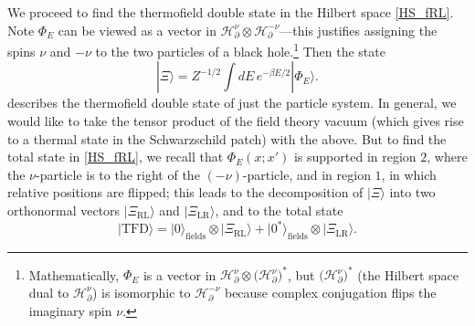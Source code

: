 \documentclass[12pt]{article}
\newcommand*{\ket}[1]{|{#1}\rangle}
\newcommand{\calH}{\mathcal{H}}
\newcommand{\la}{\text{L}}
\newcommand{\ra}{\text{R}}
\newcommand{\TFD}{\mathrm{TFD}}
\newcommand{\p}{\partial}
\begin{document}
We proceed to find the thermofield double state in the Hilbert space \eqref{HS_fRL}. Note $\Phi_E$ can be viewed as a vector in $\calH^{\nu}_{\p} \otimes \calH^{-\nu}_{\p}$---this justifies assigning the spins $\nu$ and $-\nu$ to the two particles of a black hole.\footnote{Mathematically, $\Phi_E$ is a vector in $\calH^{\nu}_{\p}\otimes\bigl(\calH^{\nu}_{\p}\bigr)^*$, but $\bigl(\calH^{\nu}_{\p}\bigr)^*$ (the Hilbert space dual to $\calH^{\nu}_{\p}$) is isomorphic to  $\calH^{-\nu}_{\p}$ because complex conjugation flips the imaginary spin $\nu$.} Then the state
\begin{equation}\label{Xi}
\ket{\Xi}=Z^{-1/2}\int dE \,e^{-\beta E/2} \ket{\Phi_E}.
\end{equation}
describes the thermofield double state of just the particle system. In general, we would like to take the tensor product of the field theory vacuum (which gives rise to a thermal state in the Schwarzschild patch) with the above. But to find the total state in \eqref{HS_fRL}, we recall that $\Phi_E(x;x')$ is supported in region $2$, where the $\nu$-particle is to the right of the $(-\nu)$-particle, and in region $1$, in which relative positions are flipped; this leads to the decomposition of $\ket{\Xi}$ into two orthonormal vectors $\ket{\Xi_{\ra\la}}$ and $\ket{\Xi_{\la\ra}}$, and to the total state 
\begin{equation}\label{TFD}
\ket{\TFD}=\ket{0}_{\text{fields}}\otimes\ket{\Xi_{\ra\la}}
+\ket{0^*}_{\text{fields}}\otimes\ket{\Xi_{\la\ra}}.
\end{equation}
\end{document}
